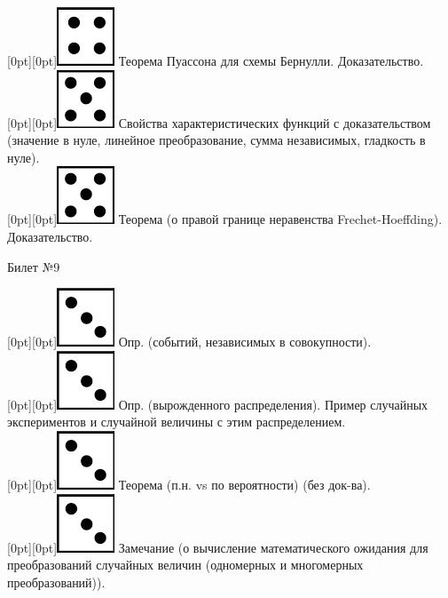 \documentclass[10pt]{article}
\begin{document}
\raisebox{-1pt}[0pt][0pt]{\includegraphics[width=0.02\linewidth]{4.png}} Теорема Пуассона для схемы Бернулли. Доказательство. \\

\raisebox{-1pt}[0pt][0pt]{\includegraphics[width=0.02\linewidth]{5.png}} Свойства характеристических функций с доказательством (значение в нуле, линейное преобразование, сумма независимых, гладкость в нуле). \\

\raisebox{-1pt}[0pt][0pt]{\includegraphics[width=0.02\linewidth]{5.png}} Теорема (о правой границе неравенства Frechet-Hoeffding).  Доказательство. \\

\begin{center} {\Large Билет №9} \end{center} 

\raisebox{-1pt}[0pt][0pt]{\includegraphics[width=0.02\linewidth]{3.png}} Опр. (событий, независимых в совокупности). \\

\raisebox{-1pt}[0pt][0pt]{\includegraphics[width=0.02\linewidth]{3.png}} Опр. (вырожденного распределения). Пример случайных экспериментов и случайной величины с этим распределением. \\

\raisebox{-1pt}[0pt][0pt]{\includegraphics[width=0.02\linewidth]{3.png}} Теорема (п.н. vs по вероятности)  (без док-ва). \\

\raisebox{-1pt}[0pt][0pt]{\includegraphics[width=0.02\linewidth]{3.png}} Замечание (о вычисление  математического ожидания для преобразований случайных величин (одномерных и многомерных преобразований)). \\
\end{document}
